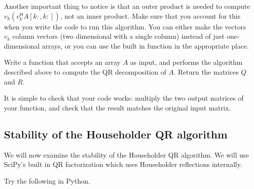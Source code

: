 
Another important thing to notice is that an outer product is needed to compute
$v_k \left( v_k^\mathsf{H} A[k:,k:] \right)$, not an inner product.
Make sure that you account for this when you write the code to run this algorithm.
You can either make the vectors $v_k$ column vectors (two dimensional with a single column) instead of just one-dimensional arrays, or you can use the built in function  in the appropriate place.

\begin{problem}
\label{prob:HouseholderQR}
Write a function  that accepts an array $A$ as input, and performs
the algorithm described above to compute the QR decomposition of $A$. Return the
matrices $Q$ and $R$.

It is simple to check that your code works: multiply the two output matrices
of your function, and check that the result matches the original input matrix.
\end{problem}

\subsection*{Stability of the Householder QR algorithm}

We will now examine the stability of the Householder QR algorithm.
We will use SciPy's built in QR factorization which uses Householder reflections internally.

Try the following in Python.

